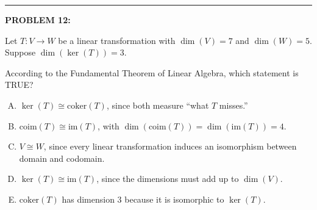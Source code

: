 \documentclass[12pt]{amsart}
\newcommand{\divider}{
  \vspace{-1em} %
  \noindent
  \raisebox{-0.15ex}{\textbullet}%
  \hspace{0.5em}%
  \rule[0.5ex]{0.95\textwidth}{1.0pt}%
  \hspace{0.5em}%
  \raisebox{-0.15ex}{\textbullet}%
  \vspace{0em} %
}
\begin{document}
\divider

{\bf PROBLEM 12:}

Let $T: V \to W$ be a linear transformation with $\dim(V) = 7$ and $\dim(W) = 5$. Suppose $\dim(\ker(T)) = 3$.

According to the Fundamental Theorem of Linear Algebra, which statement is TRUE?

\begin{enumerate}[(A)]
\item $\ker(T) \cong \text{coker}(T)$, since both measure ``what $T$ misses.''
\item $\text{coim}(T) \cong \text{im}(T)$, with $\dim(\text{coim}(T)) = \dim(\text{im}(T)) = 4$.
\item $V \cong W$, since every linear transformation induces an isomorphism between domain and codomain.
\item $\ker(T) \cong \text{im}(T)$, since the dimensions must add up to $\dim(V)$.
\item $\text{coker}(T)$ has dimension 3 because it is isomorphic to $\ker(T)$.
\end{enumerate}

\end{document}
